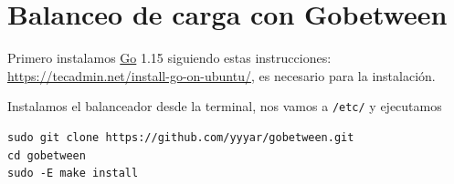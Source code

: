 \documentclass{article}
\begin{document}
\section{Balanceo de carga con Gobetween}

Primero instalamos \href{https://golang.org/}{Go} 1.15 siguiendo estas instrucciones:
\href{https://tecadmin.net/install-go-on-ubuntu/}{https://tecadmin.net/install-go-on-ubuntu/},
es necesario para la instalación.

Instalamos el balanceador desde la terminal, nos vamos a \texttt{/etc/} y ejecutamos
\begin{Verbatim}[tabsize=4]
sudo git clone https://github.com/yyyar/gobetween.git
cd gobetween
sudo -E make install
\end{Verbatim}
\end{document}
